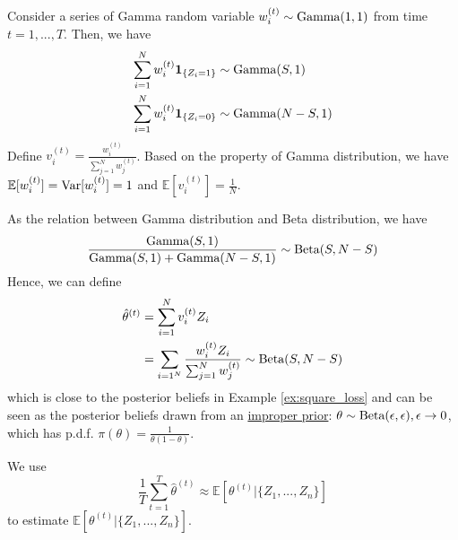 \documentclass[11pt]{elegantbook}
\begin{document}
Consider a series of Gamma random variable $w_i^{(t)}\sim \textnormal{Gamma}(1,1)$ from time $t=1,...,T$. Then, we have
\begin{equation}
    \begin{aligned}
        \sum_{i=1}^N w_i^{(t)} \mathbf{1}_{\{Z_i=1\}}&\sim \textnormal{Gamma}(S,1)\\
        \sum_{i=1}^N w_i^{(t)} \mathbf{1}_{\{Z_i=0\}}&\sim \textnormal{Gamma}(N-S,1)
    \end{aligned}
    \nonumber
\end{equation}
Define $v_i^{(t)}=\frac{w_i^{(t)}}{\sum_{j=1}^N w_j^{(t)}}$. Based on the property of Gamma distribution, we have $\mathbb{E}[w_i^{(t)}]=\textnormal{Var}[w_i^{(t)}]=1$ and $\mathbb{E}[v_i^{(t)}]=\frac{1}{N}$.

As the relation between Gamma distribution and Beta distribution, we have
\begin{equation}
    \begin{aligned}
        \frac{\textnormal{Gamma}(S,1)}{\textnormal{Gamma}(S,1)+\textnormal{Gamma}(N-S,1)}\sim \textnormal{Beta}(S,N-S)
    \end{aligned}
    \nonumber
\end{equation}
Hence, we can define
\begin{equation}
    \begin{aligned}
        \hat{\theta}^{(t)}&=\sum_{i=1}^N v_i^{(t)}Z_i\\
        &=\sum_{i=1^N}\frac{w_i^{(t)}Z_i}{\sum_{j=1}^N w_j^{(t)}}\sim \textnormal{Beta}(S,N-S)
    \end{aligned}
    \nonumber
\end{equation}
which is close to the posterior beliefs in Example \ref{ex:square_loss} and can be seen as the posterior beliefs drawn from an \underline{improper prior}: $\theta\sim \textnormal{Beta}(\epsilon,\epsilon), \epsilon \rightarrow 0$, which has p.d.f. $\pi(\theta)=\frac{1}{\theta(1-\theta)}$.

We use $$\frac{1}{T}\sum_{t=1}^T\hat{\theta}^{(t)}\approx \mathbb{E}[\theta^{(t)}|\{Z_1,...,Z_n\}]$$ to estimate $\mathbb{E}[\theta^{(t)}|\{Z_1,...,Z_n\}]$.
\end{document}
